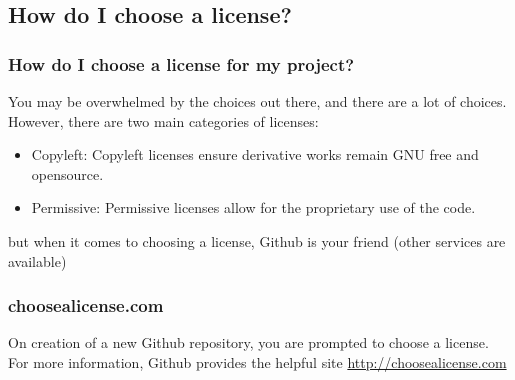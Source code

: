 \documentclass{beamer}
\begin{document}
	\subsection{How do I choose a license?}
	\begin{frame}
		\frametitle{How do I choose a license for my project?}
		You may be overwhelmed by the choices out there, and there are a lot of choices. However, there are two main categories of licenses:\\
		\pause\begin{itemize}[<+->]
			\item Copyleft: Copyleft licenses ensure derivative works remain GNU free and opensource.
			\item Permissive: Permissive licenses allow for the proprietary use of the code.
		\end{itemize}
		\pause but when it comes to choosing a license, Github is your friend (other services are available)
	\end{frame}
	\begin{frame}
		\frametitle{choosealicense.com}
		On creation of a new Github repository, you are prompted to choose a license. For more information, Github provides the helpful site \url{http://choosealicense.com}
	\end{frame}
\end{document}
